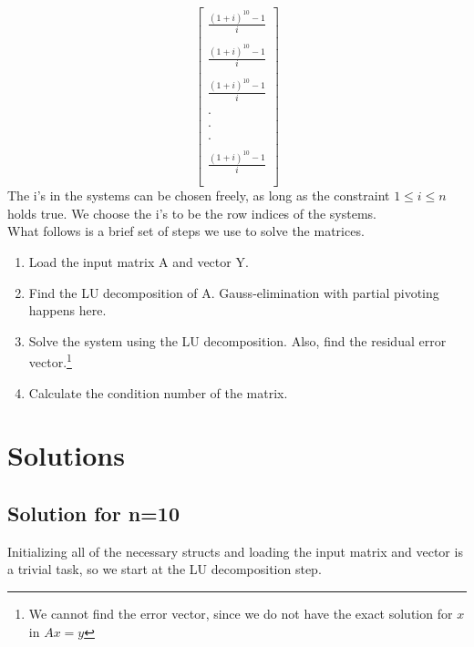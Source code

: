 \documentclass[11pt, a4paper, titlepage, openright]{article}
\begin{document}
\[\begin{bmatrix}
            \frac{(1+i)^{10} - 1}{i} \\\\
            \frac{(1+i)^{10} - 1}{i} \\\\
            \frac{(1+i)^{10} - 1}{i} \\\\
            . \\\\
            . \\\\
            . \\\\
            \frac{(1+i)^{10} - 1}{i} \\\\
        \end{bmatrix}
    \]
    The i's in the systems can be chosen freely, as long as the constraint \( 1 \le i \le n \) holds true.
    We choose the i's to be the row indices of the systems. \\
    What follows is a brief set of steps we use to solve the matrices.
    \begin{enumerate}
        \item Load the input matrix A and vector Y.
        \item Find the LU decomposition of A.
                    \subitem Gauss-elimination with partial pivoting happens here.
        \item Solve the system using the LU decomposition.
            \subitem Also, find the residual error vector.\footnote{We cannot find the error vector, since we do not have the exact solution for \(x\) in \(Ax = y\)}
        \item Calculate the condition number of the matrix.
    \end{enumerate}
    
\newpage
\section{Solutions}
\label{sec:solutions}
    \subsection{Solution for n=10}
        Initializing all of the necessary structs and loading the input matrix and vector
        is a trivial task, so we start at the LU decomposition step.
\end{document}
